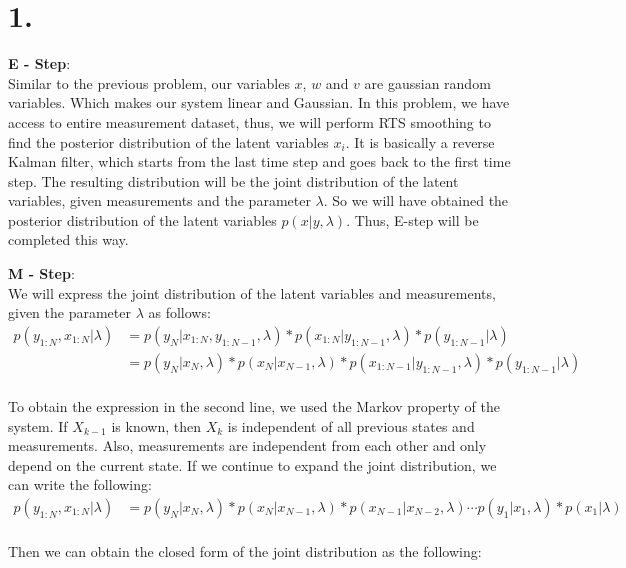 \documentclass{article}
\begin{document}
\pagestyle{fancy}


\section*{1.}

\textbf{E - Step}:\\
Similar to the previous problem, our variables $x$, $w$ and $v$ are gaussian random variables. Which makes our system linear and Gaussian. In this problem, we have access to entire
measurement dataset, thus, we will perform RTS smoothing to find the posterior distribution of the latent variables $x_i$. It is basically a reverse Kalman filter, which starts
from the last time step and goes back to the first time step. The resulting distribution will be the joint distribution of the latent variables, given measurements and the
parameter $\lambda$. So we will have obtained the posterior distribution of the latent variables $p(x|y,\lambda)$. Thus, E-step will be completed this way.

\textbf{M - Step}:\\

We will express the joint distribution of the latent variables and measurements, given the parameter $\lambda$ as follows:
\[
    \begin{aligned}
        p(y_{1:N},x_{1:N}|\lambda) &= p(y_{N}|x_{1:N},y_{1:N-1},\lambda)*p(x_{1:N}|y_{1:N-1},\lambda)*p(y_{1:N-1}|\lambda)\\
                                   &= p(y_{N}|x_{N},\lambda)*p(x_{N}|x_{N-1},\lambda)*p(x_{1:N-1}|y_{1:N-1},\lambda)*p(y_{1:N-1}|\lambda)\\
    \end{aligned}
\]

To obtain the expression in the second line, we used the Markov property of the system. If $X_{k-1}$ is known, then $X_k$ is independent of all previous states and measurements. 
Also, measurements are independent from each other and only depend on the current state. If we continue to expand the joint distribution, we can write the following:
\[
    \begin{aligned}
        p(y_{1:N},x_{1:N}|\lambda) &= p(y_{N}|x_{N},\lambda)*p(x_{N}|x_{N-1},\lambda)*p(x_{N-1}|x_{N-2},\lambda) \cdots p(y_{1}|x_{1},\lambda)*p(x_{1}|\lambda)\\
    \end{aligned}
\]

Then we can obtain the closed form of the joint distribution as the following: 
\end{document}
